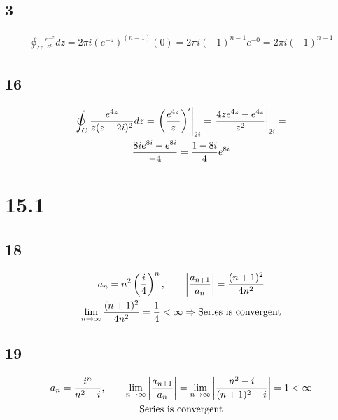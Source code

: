 \subsection*{3}


\begin{gather*}
	\oint_C{\frac{e^{-z}}{z^n} dz} = 2 \pi i (e^{-z})^{(n - 1)} (0) = 2 \pi i (-1)^{n - 1} e^{-0} = 2 \pi i (-1)^{n - 1}
\end{gather*}


\subsection*{16}


\begin{gather*}
	\oint_C{\frac{e^{4z}}{z(z - 2i)^2} dz} = \left.\left(\frac{e^{4z}}{z}\right)'\right|_{2 i} = \left.\frac{4 z e^{4 z} - e^{4 z}}{z^2}\right|_{2 i}
	=
	\\
	\frac{8 ie^{8 i} - e^{8 i}}{-4} = \frac{1 - 8 i}{4} e^{8 i}
\end{gather*}


\section*{15.1}

\subsection*{18}


\begin{gather*}
	a_n = n^2 \left(\frac{i}{4}\right)^n,
	\qquad
	\left| \frac{a_{n + 1}}{a_n} \right| = \frac{(n + 1)^2}{4 n^2}
	\\
	\lim_{n \rightarrow \infty}{\frac{(n + 1)^2}{4 n^2}} = \frac{1}{4} < \infty \Rightarrow \text{Series is convergent}
\end{gather*}


\subsection*{19}


\begin{gather*}
	a_n = \frac{i^n}{n^2 - i},
	\qquad
	\lim_{n \rightarrow \infty}{\left| \frac{a_{n + 1}}{a_n} \right|} = \lim_{n \rightarrow \infty}{\left| \frac{n^2 - i}{(n + 1)^2 - i} \right|}
	=
	1 < \infty
	\\
	\text{Series is convergent}
\end{gather*}

